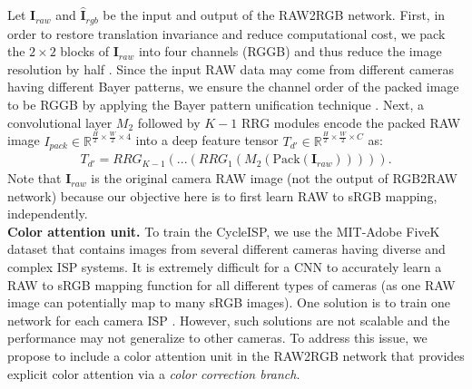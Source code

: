 \documentclass[10pt,twocolumn,letterpaper]{article}
\begin{document}
Let $\mathbf{I}_{raw}$ 
and $\hat{\mathbf{I}}_{rgb}$ be
the input and output of the RAW2RGB network.
First, in order to restore translation invariance and reduce computational cost, we pack the $2{\times}2$ blocks of $\mathbf{I}_{raw}$ into four channels (RGGB) and thus reduce the image resolution by half \cite{Brooks2019,Chen2018,Gharbi2016}. 
Since the input RAW data may come from different cameras having different Bayer patterns, we ensure the channel order of the packed image to be RGGB by applying the Bayer pattern unification technique \cite{liu2019learning}. 
Next, a convolutional layer $M_2$ followed by ${K-1}$ RRG modules encode the packed RAW image $I_{pack}\in \mathbb{R}^{\frac{H}{2}{\times}\frac{W}{2}{\times} 4}$ into a deep feature tensor $T_{d'}\in \mathbb{R}^{\frac{H}{2}{\times}\frac{W}{2}{\times} C}$ as:
\begin{align}
T_{d'} = RRG_{K-1}(...(RRG_1(M_2(\text{Pack}(\mathbf{I}_{raw}))))).
\label{Eq:raw2rgb DF tensor}
\end{align}
Note that $\mathbf{I}_{raw}$ is the original camera RAW image (not the output of RGB2RAW network) because our objective here is to first learn RAW to sRGB mapping, independently. 
\vspace{0.4em}\\
\noindent \textbf{Color attention unit.}
To train the CycleISP, we use the MIT-Adobe FiveK dataset \cite{mit_fivek} that contains images from several different cameras having diverse and complex ISP systems. 
It is extremely difficult for a CNN to accurately learn a RAW to sRGB mapping function for all different types of cameras (as one RAW image can potentially map to many sRGB images). 
One solution is to train one network for each camera ISP \cite{Chen2018,Schwartz2018,zamir2019ISP}. 
However, such solutions are not  
scalable and the performance may not generalize to other cameras. 
To address this issue, we propose to include a color attention unit in the RAW2RGB network that provides explicit color attention via a \emph{color correction branch}. 
\end{document}
